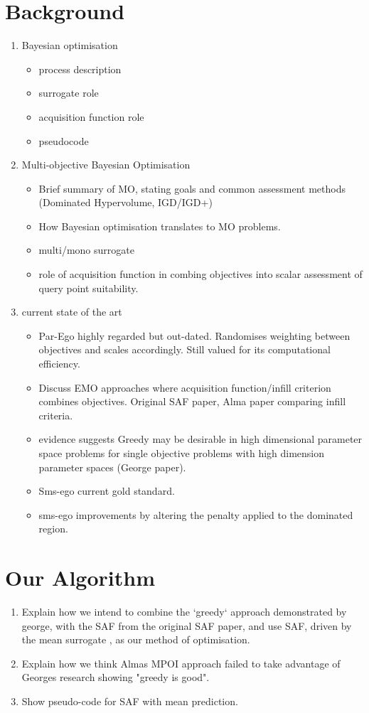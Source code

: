 \documentclass[runningheads]{llncs}
\begin{document}
\section{Background}
\begin{enumerate}
    \item Bayesian optimisation
    \begin{itemize}
        \item process description
        \item surrogate role
        \item acquisition function role
        \item pseudocode
    \end{itemize}
    \item Multi-objective Bayesian Optimisation
    \begin{itemize}
        \item Brief summary of MO, stating goals and common assessment methods (Dominated Hypervolume, IGD/IGD+)
        \item How Bayesian optimisation translates to MO problems.
        \item multi/mono surrogate
        \item role of acquisition function in combing objectives into scalar assessment of query point suitability. 
    \end{itemize}
    \item current state of the art
    \begin{itemize}
        \item Par-Ego highly regarded but out-dated. Randomises weighting between objectives and scales accordingly. Still valued for its computational efficiency.
        \item Discuss EMO approaches where acquisition function/infill criterion combines objectives. Original SAF paper, Alma paper comparing infill criteria.
        \item evidence suggests Greedy may be desirable in high dimensional parameter space problems for single objective problems with high dimension parameter spaces (George paper).
        \item Sms-ego current gold standard.
        \item sms-ego improvements by altering the penalty applied to the dominated region.
    \end{itemize}
\end{enumerate}

\section{Our Algorithm}
\begin{enumerate}
    \item Explain how we intend to combine the `greedy` approach demonstrated by george, with the SAF from the original SAF paper, and use SAF, driven by the mean surrogate , as our method of optimisation. 
    \item Explain how we think Almas MPOI approach failed to take advantage of Georges research showing "greedy is good". 
    \item Show pseudo-code for SAF with mean prediction. 
\end{enumerate}
\end{document}

